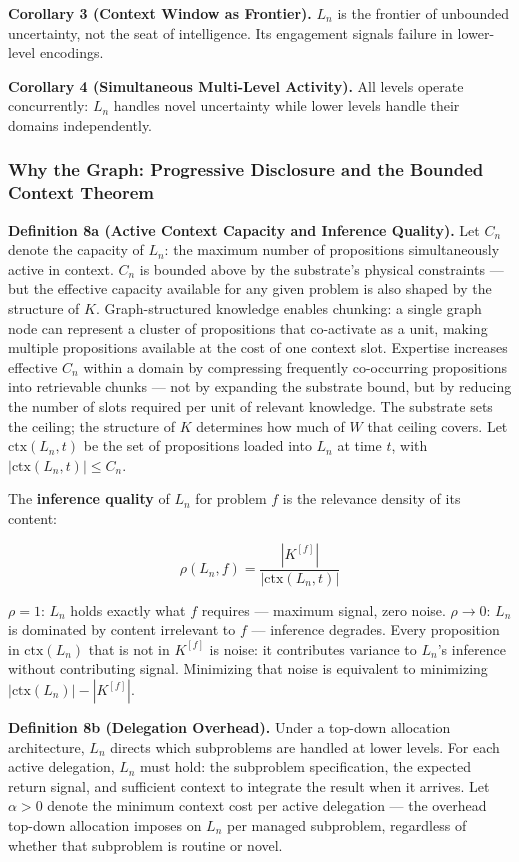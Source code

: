 \documentclass[
]{article}
\begin{document}
\textbf{Corollary 3 (Context Window as Frontier).} \(L_n\) is the
frontier of unbounded uncertainty, not the seat of intelligence. Its
engagement signals failure in lower-level encodings.

\textbf{Corollary 4 (Simultaneous Multi-Level Activity).} All levels
operate concurrently: \(L_n\) handles novel uncertainty while lower
levels handle their domains independently.

\subsubsection{Why the Graph: Progressive Disclosure and the Bounded
Context
Theorem}\label{why-the-graph-progressive-disclosure-and-the-bounded-context-theorem}

\textbf{Definition 8a (Active Context Capacity and Inference Quality).}
Let \(C_n\) denote the capacity of \(L_n\): the maximum number of
propositions simultaneously active in context. \(C_n\) is bounded above
by the substrate's physical constraints --- but the effective capacity
available for any given problem is also shaped by the structure of
\(K\). Graph-structured knowledge enables chunking: a single graph node
can represent a cluster of propositions that co-activate as a unit,
making multiple propositions available at the cost of one context slot.
Expertise increases effective \(C_n\) within a domain by compressing
frequently co-occurring propositions into retrievable chunks --- not by
expanding the substrate bound, but by reducing the number of slots
required per unit of relevant knowledge. The substrate sets the ceiling;
the structure of \(K\) determines how much of \(W\) that ceiling covers.
Let \(\text{ctx}(L_n, t)\) be the set of propositions loaded into
\(L_n\) at time \(t\), with \(|\text{ctx}(L_n, t)| \leq C_n\).

The \textbf{inference quality} of \(L_n\) for problem \(f\) is the
relevance density of its content:

\[\rho(L_n, f) = \frac{|K^{[f]}|}{|\text{ctx}(L_n, t)|}\]

\(\rho = 1\): \(L_n\) holds exactly what \(f\) requires --- maximum
signal, zero noise. \(\rho \to 0\): \(L_n\) is dominated by content
irrelevant to \(f\) --- inference degrades. Every proposition in
\(\text{ctx}(L_n)\) that is not in \(K^{[f]}\) is noise: it contributes
variance to \(L_n\)'s inference without contributing signal. Minimizing
that noise is equivalent to minimizing
\(|\text{ctx}(L_n)| - |K^{[f]}|\).

\textbf{Definition 8b (Delegation Overhead).} Under a top-down
allocation architecture, \(L_n\) directs which subproblems are handled
at lower levels. For each active delegation, \(L_n\) must hold: the
subproblem specification, the expected return signal, and sufficient
context to integrate the result when it arrives. Let \(\alpha > 0\)
denote the minimum context cost per active delegation --- the overhead
top-down allocation imposes on \(L_n\) per managed subproblem,
regardless of whether that subproblem is routine or novel.
\end{document}
